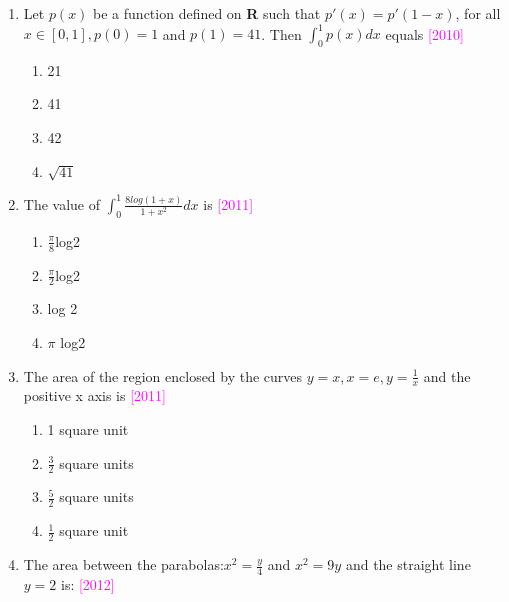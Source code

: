 \documentclass[journal,12pt,twocolumn]{IEEEtran}
\theoremstyle{remark}
\begin{document}
\begin{enumerate}[label=\textcolor{magenta}{\arabic*.}]

	\item Let $p(x)$ be a function defined on \textbf{R} such that $p'(x)=p'(1-x)$, for all $x\in[0,1],p(0)=1$ and $p(1)=41$. Then $\int_0^1p(x)dx$ equals
		\hfill{\textcolor{magenta}{[2010]}}

					\begin{multicols}{4}
			\begin{enumerate}[label=(\alph*)]
				\item 21
				\item 41
				\item 42
				\item $\sqrt{41}$
			\end{enumerate}
		\end{multicols}


	\item The value of $\int_0^1\frac{8log(1+x)}{1+x^2}dx$ is
		\hfill{\textcolor{magenta}{[2011]}}

		\begin{multicols}{2}
			\begin{enumerate}[label=(\alph*)]
				\item $\frac{\pi}{8}$log2
				\item $\frac{\pi}{2}$log2
				\item log 2
				\item $\pi$ log2
			\end{enumerate}
		\end{multicols}


	\item The area of the region enclosed by the curves $y=x, x=e, y=\frac{1}{x}$ and the positive x axis is
		\hfill{\textcolor{magenta}{[2011]}}

		\begin{multicols}{2}
			\begin{enumerate}[label=(\alph*)]
				\item 1 square unit
				\item $\frac{3}{2}$ square units
				\item $\frac{5}{2}$ square units
				\item $\frac{1}{2}$ square unit
			\end{enumerate}
		\end{multicols}


	\item The area between the parabolas:$x^2=\frac{y}{4}$ and $x^2=9y$ and the straight line $y=2$ is:
		\hfill{\textcolor{magenta}{[2012]}}


\end{enumerate}
\end{document}
